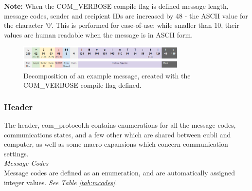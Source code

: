 \textbf{Note:} When the COM\_VERBOSE compile flag is defined message length, message codes, sender and recipient IDs are increased by 48 - the ASCII value for the character '0'. This is performed for ease-of-use: while smaller than 10, their values are human readable when the message is in ASCII form. 

\begin{figure}[ht]
   \centering
   \includegraphics[width=0.75\textwidth]{img/Message.png}
   \caption{Decomposition of an example message, created with the COM\_VERBOSE compile flag defined.}
   \label{img:Message}
\end{figure}

\subsubsection{Header}

The header, com\_protocol.h contains enumerations for all the message codes, communications states, and a few other which are shared between cubli and computer, as well as some macro expansions which concern communication settings.\\

\textit{Message Codes}\\

Message codes are defined as an enumeration, and are automatically assigned integer values. \textit{See Table \ref{tab:mcodes}}.\\

